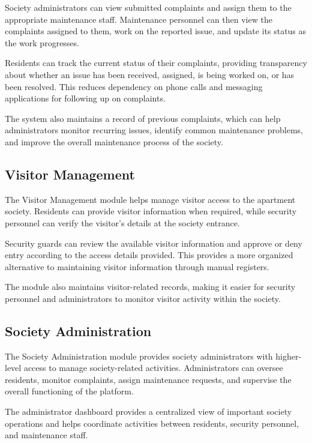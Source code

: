 \documentclass{tietreport}
\begin{document}
Society administrators can view submitted complaints and
assign them to the appropriate maintenance staff.
Maintenance personnel can then view the complaints
assigned to them, work on the reported issue, and update
its status as the work progresses.

Residents can track the current status of their
complaints, providing transparency about whether an issue
has been received, assigned, is being worked on, or has
been resolved. This reduces dependency on phone calls and
messaging applications for following up on complaints.

The system also maintains a record of previous complaints,
which can help administrators monitor recurring issues,
identify common maintenance problems, and improve the
overall maintenance process of the society.

\subsection{Visitor Management}

The Visitor Management module helps manage visitor access
to the apartment society. Residents can provide visitor
information when required, while security personnel can
verify the visitor's details at the society entrance.

Security guards can review the available visitor
information and approve or deny entry according to the
access details provided. This provides a more organized
alternative to maintaining visitor information through
manual registers.

The module also maintains visitor-related records, making
it easier for security personnel and administrators to
monitor visitor activity within the society.

\subsection{Society Administration}

The Society Administration module provides society
administrators with higher-level access to manage
society-related activities. Administrators can oversee
residents, monitor complaints, assign maintenance
requests, and supervise the overall functioning of the
platform.

The administrator dashboard provides a centralized view
of important society operations and helps coordinate
activities between residents, security personnel, and
maintenance staff.
\end{document}
